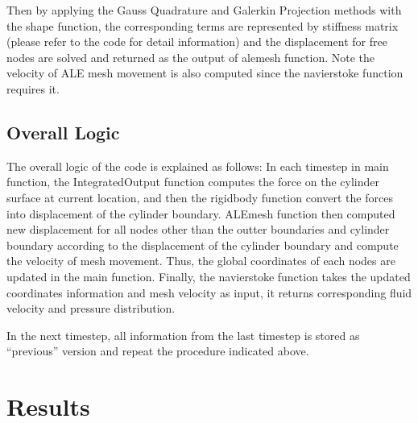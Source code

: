 \documentclass[a4paper,12pt]{article} %
\begin{document}
Then by applying the Gauss Quadrature and Galerkin Projection methods with the shape function, the corresponding terms 
are represented by stiffness matrix (please refer to the code for detail information) and the displacement for free nodes 
are solved and returned as the output of alemesh function. Note the velocity of ALE mesh movement is also computed since 
the navierstoke function requires it. 

\subsection*{Overall Logic}
The overall logic of the code is explained as follows: In each timestep in main function, the IntegratedOutput function computes the force on the cylinder surface at current location, and then 
the rigidbody function convert the forces into displacement of the cylinder boundary. ALEmesh function then computed new 
displacement for all nodes other than the outter boundaries and cylinder boundary according to the displacement of the 
cylinder boundary and compute the velocity of mesh movement. Thus, the global coordinates of each nodes are updated 
in the main function. Finally, the navierstoke function takes the updated coordinates information and mesh velocity as input,
it returns corresponding fluid velocity and pressure distribution.

In the next timestep, all information from the last timestep is stored as ``previous'' version and repeat the 
procedure indicated above. 

\section*{Results}
\end{document}
